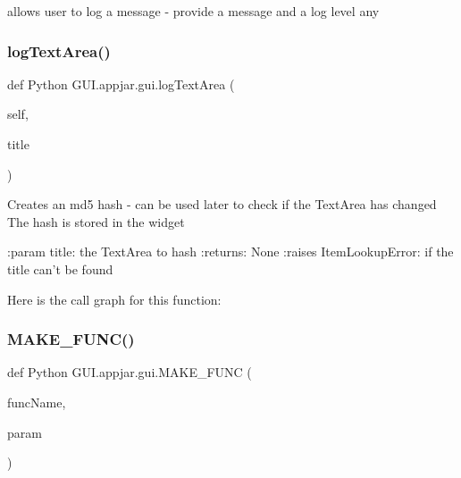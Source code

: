 \begin{DoxyVerb}allows user to log a message - provide a message and a log level
    any %
 \mbox{\label{class_python_01_g_u_i_1_1appjar_1_1gui_abe244b3c22292dfa85da8b28d73acbab}} 
\subsubsection{\texorpdfstring{log\+Text\+Area()}{logTextArea()}}
{\footnotesize\ttfamily def Python G\+U\+I.\+appjar.\+gui.\+log\+Text\+Area (\begin{DoxyParamCaption}\item[{}]{self,  }\item[{}]{title }\end{DoxyParamCaption})}

\begin{DoxyVerb}Creates an md5 hash - can be used later to check if the TextArea has changed
The hash is stored in the widget

:param title: the TextArea to hash
:returns: None
:raises ItemLookupError: if the title can't be found
\end{DoxyVerb}
 Here is the call graph for this function\+:
\mbox{\label{class_python_01_g_u_i_1_1appjar_1_1gui_a1d2c0d0a475441a8f9208204ef3227a6}} 
\subsubsection{\texorpdfstring{M\+A\+K\+E\+\_\+\+F\+U\+N\+C()}{MAKE\_FUNC()}}
{\footnotesize\ttfamily def Python G\+U\+I.\+appjar.\+gui.\+M\+A\+K\+E\+\_\+\+F\+U\+NC (\begin{DoxyParamCaption}\item[{}]{func\+Name,  }\item[{}]{param }\end{DoxyParamCaption})\hspace{0.3cm}{\ttfamily [static]}}




\end{DoxyVerb}
